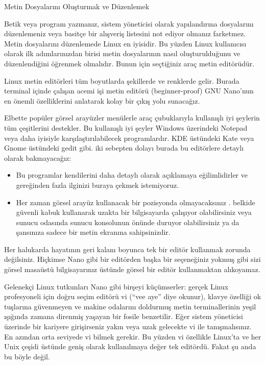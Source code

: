 \begin{section}{Metin Dosyalarını Oluşturmak ve Düzenlemek}

Betik veya program yazmanız, sistem yöneticisi olarak yapılandırma dosyalarını düzenlemeniz veya basitçe bir alışveriş listesini not ediyor olmanız farketmez. Metin dosyalarını düzenlemede Linux en iyisidir. Bu yüzden Linux kullanıcısı olarak ilk adımlarınızdan birisi metin dosyalarının nasıl oluşturulduğunu ve düzenlendiğini öğrenmek olmalıdır. Bunun için seçtiğiniz araç metin editörüdür. 

Linux metin editörleri tüm boyutlarda şekillerde ve renklerde gelir. Burada terminal içinde çalışan acemi işi metin editörü (beginner-proof) GNU Nano’nun en önemli özelliklerini anlatarak kolay bir çıkış yolu sunacağız.

Elbette popüler görsel arayüzler menülerle araç çubuklarıyla kullanışlı iyi şeylerin tüm çeşitlerini destekler.  Bu kullanışlı iyi şeyler Windows üzerindeki Notepad veya daha iyisiyle karşılaştırılabilecek programlardır. KDE üstündeki Kate veya Gnome üstündeki gedit gibi. iki sebepten dolayı  burada bu editörlere detaylı olarak bakmayacağız:

\begin{itemize}
\item Bu programlar kendilerini daha detaylı olarak açıklamaya eğilimlidirler ve gereğinden fazla ilginizi buraya çekmek istemiyoruz. 
\item Her zaman görsel arayüz kullanacak bir pozisyonda olmayacaksınız . belkide güvenli kabuk kullanarak uzakta bir bilgisayarda çalışıyor olabilirsiniz veya sunucu odasında sunucu konsolunun önünde duruyor olabilirsiniz ya da şansınıza sadece bir metin ekranına sahipsinizdir. 
\end{itemize}

Her halukarda hayatının geri kalanı boyunca tek bir editör kullanmak zorunda değilsiniz. Hiçkimse Nano gibi bir editörden başka bir seçeneğiniz yokmuş gibi sizi görsel masaüstü bilgisayarınız üstünde görsel bir editör kullanmaktan alıkoyamaz.
 
Gelenekçi Linux tutkunları Nano gibi birşeyi küçümserler: gerçek Linux profesyoneli için doğru seçim editörü vi (“vee aye” diye okunur), klavye özelliği ok tuşlarına güvenmeyen ve makine odalarını doldurmuş metin terminallerinin yeşil ışığında zamana direnmiş yaşayan bir fosile benzetilir. Eğer sistem yöneticisi üzerinde bir kariyere girişirseniz yakın veya uzak gelecekte vi ile tanışmalısınız. En azından orta seviyede vi bilmek gerekir. Bu yüzden vi özellikle Linux’ta ve her Unix çeşidi üstünde geniş olarak kullanılmaya değer tek editördü. Fakat şu anda bu böyle değil. 


\end{section}
